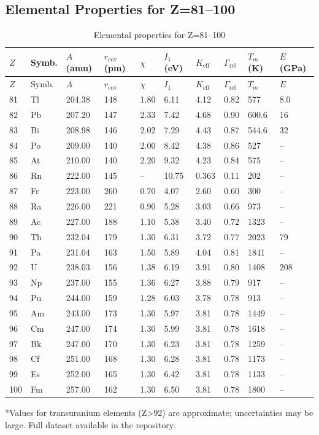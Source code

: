 \documentclass[12pt,a4paper]{article}
\newcommand{\Keff}{K_{\mathrm{eff}}}
\begin{document}
	\subsection*{Elemental Properties for Z=81–100}
	
	\begin{longtable}{p{0.6cm}p{1.2cm}p{1.2cm}p{1.2cm}p{1.2cm}p{1.2cm}p{1.5cm}p{1.2cm}p{1.2cm}p{1.2cm}}
		\caption{Elemental properties for Z=81–100} \label{tab:elem-data-81to100} \\
		\toprule
		\(Z\) & Symb. & \(A\) (amu) & \(r_{\text{cov}}\) (pm) & \(\chi\) & \(I_1\) (eV) & \(\Keff\) & \(\Gamma_{\text{rel}}\) & \(T_m\) (K) & \(E\) (GPa) \\
		\midrule
		\endfirsthead
		\toprule
		\(Z\) & Symb. & \(A\) & \(r_{\text{cov}}\) & \(\chi\) & \(I_1\) & \(\Keff\) & \(\Gamma_{\text{rel}}\) & \(T_m\) & \(E\) \\
		\midrule
		\endhead
		81 & Tl & 204.38 & 148 & 1.80 & 6.11 & 4.12 & 0.82 & 577 & 8.0 \\
		82 & Pb & 207.20 & 147 & 2.33 & 7.42 & 4.68 & 0.90 & 600.6 & 16 \\
		83 & Bi & 208.98 & 146 & 2.02 & 7.29 & 4.43 & 0.87 & 544.6 & 32 \\
		84 & Po & 209.00 & 140 & 2.00 & 8.42 & 4.38 & 0.86 & 527 & – \\
		85 & At & 210.00 & 140 & 2.20 & 9.32 & 4.23 & 0.84 & 575 & – \\
		86 & Rn & 222.00 & 145 & –    & 10.75 & 0.363 & 0.11 & 202 & – \\
		87 & Fr & 223.00 & 260 & 0.70 & 4.07 & 2.60 & 0.60 & 300 & – \\
		88 & Ra & 226.00 & 221 & 0.90 & 5.28 & 3.03 & 0.66 & 973 & – \\
		89 & Ac & 227.00 & 188 & 1.10 & 5.38 & 3.40 & 0.72 & 1323 & – \\
		90 & Th & 232.04 & 179 & 1.30 & 6.31 & 3.72 & 0.77 & 2023 & 79 \\
		91 & Pa & 231.04 & 163 & 1.50 & 5.89 & 4.04 & 0.81 & 1841 & – \\
		92 & U  & 238.03 & 156 & 1.38 & 6.19 & 3.91 & 0.80 & 1408 & 208 \\
		93 & Np & 237.00 & 155 & 1.36 & 6.27 & 3.88 & 0.79 & 917 & – \\
		94 & Pu & 244.00 & 159 & 1.28 & 6.03 & 3.78 & 0.78 & 913 & – \\
		95 & Am & 243.00 & 173 & 1.30 & 5.97 & 3.81 & 0.78 & 1449 & – \\
		96 & Cm & 247.00 & 174 & 1.30 & 5.99 & 3.81 & 0.78 & 1618 & – \\
		97 & Bk & 247.00 & 170 & 1.30 & 6.23 & 3.81 & 0.78 & 1259 & – \\
		98 & Cf & 251.00 & 168 & 1.30 & 6.28 & 3.81 & 0.78 & 1173 & – \\
		99 & Es & 252.00 & 165 & 1.30 & 6.42 & 3.81 & 0.78 & 1133 & – \\
		100& Fm & 257.00 & 162 & 1.30 & 6.50 & 3.81 & 0.78 & 1800 & – \\
		\bottomrule
	\end{longtable}
	*Values for transuranium elements (Z>92) are approximate; uncertainties may be large. Full dataset available in the repository.
	
\end{document}
